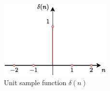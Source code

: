 \begin{figure}[H]
    \begin{center}
    \includegraphics[width=0.5\textwidth]{figures/experiments/figDelta.pdf}
    \end{center}
    \caption[Unit sample function $\delta(n)$]{Unit sample function $\delta(n)$}
    \label{fig:delta}
\end{figure}
